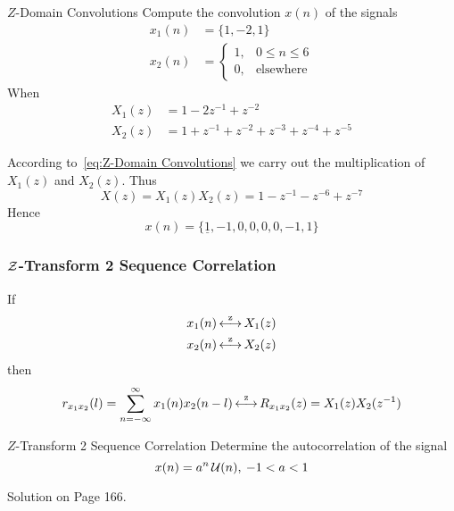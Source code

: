 \begin{example}[Example 3.2.9]{\texorpdfstring{$Z$-Domain}{Z-Domain} Convolutions}
  Compute the convolution $x(n)$ of the signals
  \begin{align*}
    x_{1}(n) &= \lbrace 1, -2, 1 \rbrace \\
    x_{2}(n) &= \begin{cases}
      1, & 0 \leq n \leq 6 \\
      0, & \text{elsewhere}
    \end{cases}
  \end{align*}
  When
  \begin{align*}
    X_{1}(z) &= 1-2z^{-1}+z^{-2} \\
    X_{2}(z) &= 1 + z^{-1} + z^{-2} + z^{-3} + z^{-4} + z^{-5}
  \end{align*}

  \tcblower

  According to~\eqref{eq:Z-Domain Convolutions} we carry out the multiplication of $X_{1}(z)$ and $X_{2}(z)$.
  Thus
  \begin{equation*}
    X(z) = X_{1}(z)X_{2}(z) = 1-z^{-1}-z^{-6}+z^{-7}
  \end{equation*}
  Hence
  \begin{equation*}
    x(n) = \lbrace \underline{1}, -1, 0, 0, 0, 0, -1, 1 \rbrace
  \end{equation*}
\end{example}

\subsubsection{\texorpdfstring{$\operatorname{\mathcal{Z}}$-Transform}{Z-Transform} 2 Sequence Correlation}\label{subsubsec:Z-Transform 2 Sequence Correlation}
If
\begin{equation*}
  \begin{aligned}
    x_{1}(n) &\operatorname{\overset{z}{\longleftrightarrow}} X_{1}(z) \\
    x_{2}(n) &\operatorname{\overset{z}{\longleftrightarrow}} X_{2}(z) \\
  \end{aligned}
\end{equation*}
then
\begin{equation}\label{eq:Z-Transform 2 Sequence Correlation}
  r_{x_{1}x_{2}}(l) = \sum\limits_{n=-\infty}^{\infty} x_{1}(n)x_{2}(n-l) \operatorname{\overset{z}{\longleftrightarrow}} R_{x_{1}x_{2}}(z) = X_{1}(z)X_{2}(z^{-1})
\end{equation}

\begin{example}[Example 3.2.10]{\texorpdfstring{$Z$-Transform}{Z-Transform} 2 Sequence Correlation}
  Determine the autocorrelation of the signal
  \begin{equation*}
    x(n) = a^{n}\operatorname{\mathcal{U}}(n), \> -1<a<1
  \end{equation*}

  \tcblower

  Solution on Page 166.
\end{example}

